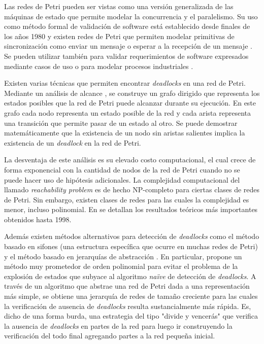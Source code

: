 \documentclass[12pt]{article}
\begin{document}
Las redes de Petri pueden ser vistas como una versión generalizada de las máquinas de estado que permite modelar la concurrencia y el paralelismo.
Su uso como método formal de validación de software está establecido desde finales de los años 1980 y
existen redes de Petri que permiten modelar primitivas de sincronización como enviar un mensaje o esperar a la recepción de un mensaje \cite{heiner1998}.
Se pueden utilizar también para validar requerimientos de software expresados mediante casos de uso \cite{silva-dossantos2004}
o para modelar procesos industriales \cite{aalst1994}.

Existen varias técnicas que permiten encontrar \textit{deadlocks} en una red de Petri.
Mediante un análisis de alcance \cite{murata1989}, se construye un grafo dirigido
que representa los estados posibles que la red de Petri puede alcanzar durante su ejecución.
En este grafo cada nodo representa un estado posible de la red y cada arista representa una transición que permite pasar de un estado al otro.
Se puede demostrar matemáticamente que la existencia de un nodo sin aristas salientes implica la existencia de un \textit{deadlock} en la red de Petri.

La desventaja de este análisis es su elevado costo computacional, el cual crece de forma exponencial
con la cantidad de nodos de la red de Petri cuando no se puede hacer uso de hipótesis adicionales.
La complejidad computacional del llamado \textit{reachability problem} es de hecho NP-completo para ciertas clases de redes de Petri.
Sin embargo, existen clases de redes para las cuales la complejidad es menor, incluso polinomial.
En \cite{esparza1994} se detallan los resultados teóricos más importantes obtenidos hasta 1998.

Además existen métodos alternativos para detección de \textit{deadlocks}
como el método basado en sifones (una estructura específica que ocurre en muchas redes de Petri) \cite{hu2011} y
el método basado en jerarquías de abstracción \cite{kungas2005}.
En particular, \cite{kungas2005} propone un método muy prometedor de orden polinomial para evitar el problema
de la explosión de estados que subyace al algoritmo \textit{naïve} de detección de \textit{deadlocks}.
A través de un algoritmo que abstrae una red de Petri dada a una representación más simple,
se obtiene una jerarquía de redes de tamaño creciente para las cuales la verificación de ausencia de \textit{deadlocks} resulta sustancialmente más rápida.
Es, dicho de una forma burda, una estrategia del tipo "divide y vencerás" que verifica la ausencia de \textit{deadlocks}
en partes de la red para luego ir construyendo la verificación del todo final agregando partes a la red pequeña inicial.
\end{document}
